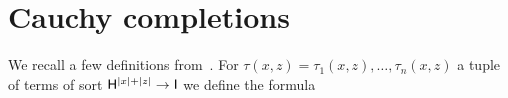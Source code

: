 \documentclass{amsproc}
\begin{document}
{\begin{comment}
\begin{proof}
  Let $\varphi(x)$ be a positive formula.
  We need to prove that for every $\varphi'>\varphi$ there is some formula $\psi(x)\in{\EuScript L}^{\rm p}_{{\sf I}{\rm qf}}$ such that $\varphi(x)\rightarrow\psi(x)\rightarrow\varphi'(x)$.
  By Corollary~\ref{corol_Lcomplete} and Proposition~\ref{prop_approx}

  \ceq{\hfill\neg\varphi(x)}{\rightarrow}{\bigvee_{p'(x)\rightarrow\neg\varphi(x)}p'(x)}

  where $p(x)$ ranges over the maximally consistent ${\EuScript L}^{\rm p}_{{\sf I}{\rm qf}}$-types.
  By Fact~\ref{fact_compactness_imp} and Lemma~\ref{lem_interpolation}

  \ceq{\hfill\neg\varphi(x)}{\rightarrow}{\bigvee_{\neg\tilde{\psi}(x)\rightarrow\neg\varphi(x)}\neg\tilde{\psi}(x),}

  where $\tilde{\psi}(x)\in{\EuScript L}^{\rm p}_{{\sf I}{\rm qf}}$.
  Equivalently,

  \ceq{\hfill\varphi(x)}{\leftarrow}{\bigwedge_{\tilde{\psi}(x)\leftarrow\varphi(x)}\tilde{\psi}(x).}

  By compactness, see Fact~\ref{fact_compactness_imp}, for every $\varphi'>\varphi$ there are some finitely many $\tilde{\psi}_i(x)\in{\EuScript L}^{\rm p}_{{\sf I}{\rm qf}}$ such that

  \ceq{\hfill\varphi'(x)}{\leftarrow}{\bigwedge_{i=1,\dots,n}\tilde{\psi}_i(x)\ \ \leftarrow\ \ \varphi(x)}

  which yields the interpolant required by the proposition.
\end{proof}


  
\end{comment}

\section{Cauchy completions}\label{Cauchy}

We recall a few definitions from~\cite{clcl}. For $\tau(x,z)=\tau_1(x,z),\dots,\tau_n(x,z)$ a tuple of terms of sort ${\sf H}^{|x|+|z|}\to {\sf I}$ we define the formula

}
\end{document}
